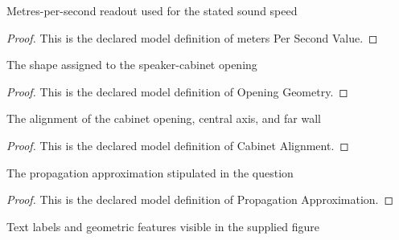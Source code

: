 \begin{definition}
  \label{def:physics:phyx-mini-0175:phyxminiproblems-problemphyxmini0175-meterspersecondvalue}
  Metres-per-second readout used for the stated sound speed
\end{definition}
\begin{proof}
  This is the declared model definition of meters Per Second Value.
\end{proof}
\begin{definition}
  \label{def:physics:phyx-mini-0175:phyxminiproblems-problemphyxmini0175-openinggeometry}
  The shape assigned to the speaker-cabinet opening
\end{definition}
\begin{proof}
  This is the declared model definition of Opening Geometry.
\end{proof}
\begin{definition}
  \label{def:physics:phyx-mini-0175:phyxminiproblems-problemphyxmini0175-cabinetalignment}
  The alignment of the cabinet opening, central axis, and far wall
\end{definition}
\begin{proof}
  This is the declared model definition of Cabinet Alignment.
\end{proof}
\begin{definition}
  \label{def:physics:phyx-mini-0175:phyxminiproblems-problemphyxmini0175-propagationapproximation}
  The propagation approximation stipulated in the question
\end{definition}
\begin{proof}
  This is the declared model definition of Propagation Approximation.
\end{proof}
\begin{definition}
  \label{def:physics:phyx-mini-0175:phyxminiproblems-problemphyxmini0175-figurefeature}
  Text labels and geometric features visible in the supplied figure
\end{definition}
